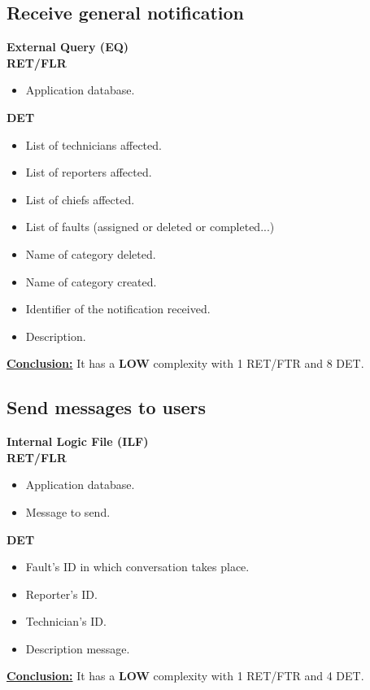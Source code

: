 \subsection{Receive general notification}
\textbf{External Query (EQ)} \\ 
\textbf{RET/FLR}
\begin{itemize}
\item Application database.
\end{itemize}
\textbf{DET}
\begin{itemize}
\item List of technicians affected.
\item List of reporters affected.
\item List of chiefs affected.
\item List of faults (assigned or deleted or completed...)
\item Name of category deleted.
\item Name of category created.
\item Identifier of the notification received.
\item Description.

\end{itemize}
\textbf{\underline{Conclusion:}} It has a \textbf{LOW} complexity with 1 RET/FTR and 8 DET.

\subsection{Send messages to users}
\textbf{Internal Logic File (ILF)} \\ 
\textbf{RET/FLR}
\begin{itemize}
\item Application database.
\item Message to send.
\end{itemize}
\textbf{DET}
\begin{itemize}
\item Fault's ID in which conversation takes place.
\item Reporter's ID.
\item Technician's ID.
\item Description message.
\end{itemize}
\textbf{\underline{Conclusion:}} It has a \textbf{LOW} complexity with 1 RET/FTR and 4 DET.

